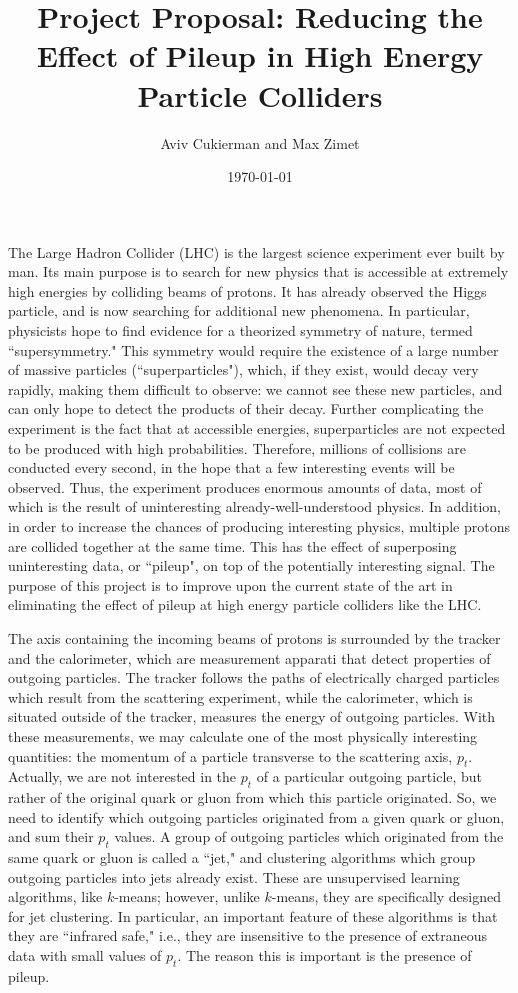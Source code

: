 \documentclass[12pt]{article}
\title{\large \vspace{-4ex}Project Proposal: Reducing the Effect of Pileup in High Energy Particle Colliders\vspace{-2ex}}
\author{\large Aviv Cukierman and Max Zimet}
\date{\vspace{-2ex}\today\vspace{-4ex}}
\numberwithin{equation}{section}
\theoremstyle{definition}
\begin{document}
\maketitle

The Large Hadron Collider (LHC) is the largest science experiment ever built by man. Its main purpose is to search for new physics that is accessible at extremely high energies by colliding beams of protons. It has already observed the Higgs particle, and is now searching for additional new phenomena. In particular, physicists hope to find evidence for a theorized symmetry of nature, termed ``supersymmetry." This symmetry would require the existence of a large number of massive particles (``superparticles"), which, if they exist, would decay very rapidly, making them difficult to observe: we cannot see these new particles, and can only hope to detect the products of their decay. Further complicating the experiment is the fact that at accessible energies, superparticles are not expected to be produced with high probabilities. Therefore, millions of collisions are conducted every second, in the hope that a few interesting events will be observed. Thus, the experiment produces enormous amounts of data, most of which is the result of uninteresting already-well-understood physics. In addition, in order to increase the chances of producing interesting physics, multiple protons are collided together at the same time. This has the effect of superposing uninteresting data, or ``pileup", on top of the potentially interesting signal. The purpose of this project is to improve upon the current state of the art in eliminating the effect of pileup at high energy particle colliders like the LHC.

The axis containing the incoming beams of protons is surrounded by the tracker and the calorimeter, which are measurement apparati that detect properties of outgoing particles. The tracker follows the paths of electrically charged particles which result from the scattering experiment, while the calorimeter, which is situated outside of the tracker, measures the energy of outgoing particles. With these measurements, we may calculate one of the most physically interesting quantities: the momentum of a particle transverse to the scattering axis, $p_t$. Actually, we are not interested in the $p_t$ of a particular outgoing particle, but rather of the original quark or gluon from which this particle originated. So, we need to identify which outgoing particles originated from a given quark or gluon, and sum their $p_t$ values. A group of outgoing particles which originated from the same quark or gluon is called a ``jet," and clustering algorithms which group outgoing particles into jets already exist\cite{ref:cacciari}. These are unsupervised learning algorithms, like $k$-means; however, unlike $k$-means, they are specifically designed for jet clustering. In particular, an important feature of these algorithms is that they are ``infrared safe," i.e., they are insensitive to the presence of extraneous data with small values of $p_t$. The reason this is important is the presence of pileup.
\end{document}
